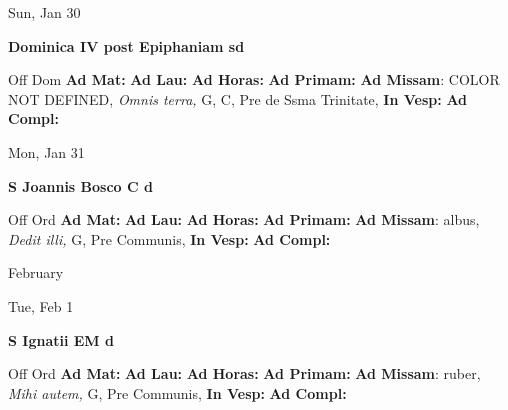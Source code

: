 \documentclass[10pt]{memoir}
\begin{document}
\begin{center}
\begin{minipage}{3.5in}
\vspace{2em}
\begin{center}Sun, Jan 30
\end{center}
\textbf{ \large Dominica IV post Epiphaniam
\textnormal{\normalsize sd}}

\begin{justify}Off Dom
\textbf{Ad Mat: }
\textbf{Ad Lau: }
\textbf{Ad Horas: }
\textbf{Ad Primam: }\textbf{Ad Missam}: COLOR NOT DEFINED, \textit{Omnis terra,} G, C, Pre de Ssma Trinitate, 
\textbf{In Vesp: }
\textbf{Ad Compl: }
\end{justify}
\end{minipage}
\end{center}

\begin{center}
\begin{minipage}{3.5in}
\vspace{2em}
\begin{center}Mon, Jan 31
\end{center}
\textbf{ \large S Joannis Bosco C
\textnormal{\normalsize d}}

\begin{justify}Off Ord
\textbf{Ad Mat: }
\textbf{Ad Lau: }
\textbf{Ad Horas: }
\textbf{Ad Primam: }\textbf{Ad Missam}: albus, \textit{Dedit illi,} G, Pre Communis, 
\textbf{In Vesp: }
\textbf{Ad Compl: }
\end{justify}
\end{minipage}
\end{center}

\begin{center}
\pagebreak
\thispagestyle{empty}
{\Huge February}
\end{center}
                    
\begin{center}
\begin{minipage}{3.5in}
\vspace{2em}
\begin{center}Tue, Feb 1
\end{center}
\textbf{ \large S Ignatii EM
\textnormal{\normalsize d}}

\begin{justify}Off Ord
\textbf{Ad Mat: }
\textbf{Ad Lau: }
\textbf{Ad Horas: }
\textbf{Ad Primam: }\textbf{Ad Missam}: ruber, \textit{Mihi autem,} G, Pre Communis, 
\textbf{In Vesp: }
\textbf{Ad Compl: }
\end{justify}
\end{minipage}
\end{center}
\end{document}
